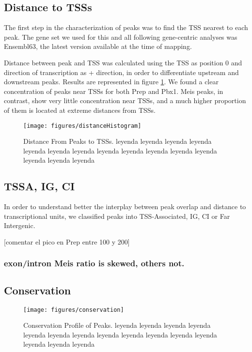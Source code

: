\subsection{Distance to TSSs}

The first step in the characterization of peaks was to find the \ac{TSS} nearest to each peak. The gene set we used for this and all following gene-centric analyses was Ensembl63, the latest version available at the time of mapping.

Distance between peak and TSS was calculated using the TSS as position 0 and direction of transcription as + direction, in order to differentiate upstream and downstream peaks. Results are represented in figure \ref{fig:distanceHistogram}. We found a clear  concentration of peaks near TSSs for both Prep and Pbx1. Meis peaks, in contrast, show very little concentration near TSSs, and a much higher proportion of them is located at extreme distances from TSSs. 

\begin{figure}[]
  
  \centering
  \label{fig:distanceHistogram}
  \texttt{[image: figures/distanceHistogram]}
  \caption[Distance From Peaks to TSSs]{Distance From Peaks to TSSs. leyenda leyenda leyenda leyenda leyenda leyenda leyenda leyenda leyenda leyenda leyenda leyenda leyenda leyenda leyenda}
\end{figure}


\subsection{TSSA, IG, CI}

In order to understand better the interplay between peak overlap and distance to transcriptional units, we classified peaks into \ac{TSS}-Associated, \ac{IG}, \ac{CI} or Far Intergenic. 

[comentar el pico en Prep entre 100 y 200]


\subsubsection{exon/intron Meis ratio is skewed, others not.}

\subsection{Conservation}

\begin{figure}[]
  
  \centering
  \label{fig:conservation}
  \texttt{[image: figures/conservation]}
  \caption[Conservation Profile of Peaks]{Conservation Profile of Peaks. leyenda leyenda leyenda leyenda leyenda leyenda leyenda leyenda leyenda leyenda leyenda leyenda leyenda leyenda leyenda}
\end{figure}


